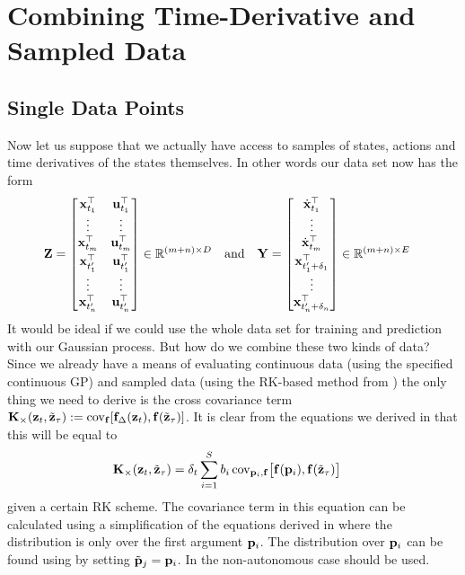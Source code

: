\section{Combining Time-Derivative and Sampled Data}
\subsection{Single Data Points}

Now let us suppose that we actually have access to samples of states, actions and time derivatives of the states themselves. In other words our data set now has the form
\begin{align}
\bZ &= \bmat{ 
\bx_{t_1}\T & \bu_{t_1}\T \\ \vdots & \vdots \\ 
\bx_{t_m}\T & \bu_{t_m}\T \\[0.1cm]
\bx_{t'_{1}}\T & \bu_{t'_{1}}\T \\ \vdots & \vdots \\ 
\bx_{t'_n}\T & \bu_{t'_n}\T} \in \RR^{(m+n) \times D} &\text{and}
%
&& \bY &= \bmat{ 
\dot\bx_{t_1}\T \\ \vdots \\ 
\dot\bx_{t_m}\T \\[0.1cm] 
\bx_{t'_{1} + \delta_{1}}\T \\ \vdots \\ 
\bx_{t'_n + \delta_n}\T} \in \RR^{(m+n)\times E} \label{eqn:cDD}
\end{align}
%
It would be ideal if we could use the whole data set for training and prediction with our Gaussian process. But how do we combine these two kinds of data? Since we already have a means of evaluating continuous data (using the specified continuous GP) and sampled data (using the RK-based method from ) the only thing we need to derive is the cross covariance term $\mathbf{K}_{\times}(\mathbf{z}_t,\tilde{\mathbf{z}}_\tau) := \mathrm{cov}_{\mathbf{f}}[\mathbf{f}_{\Delta}(\mathbf{z}_t),\mathbf{f}(\tilde{\mathbf{z}}_\tau)]$. It is clear from the equations we derived in  that this will be equal to
\begin{align}
\mathbf{K}_{\times}(\mathbf{z}_t,\tilde{\mathbf{z}}_\tau) &= \delta_t \sum_{i=1}^{S} b_i \,
\mathrm{cov}_{\mathbf{p}_i,\mathbf{f}}\big[\mathbf{f}(\mathbf{p}_i), \mathbf{f}(\tilde{\mathbf{z}}_\tau) \big]
\label{eqn:lalalala}
\end{align}
given a certain RK scheme. The covariance term in this equation can be calculated using a simplification of the equations derived in  where the distribution is only over the first argument $\mathbf{p}_i$. The distribution over $\mathbf{p}_i$ can be found using  by setting $\tilde{\mathbf{p}}_j = \mathbf{p}_i$. In the non-autonomous case  should be used. 


